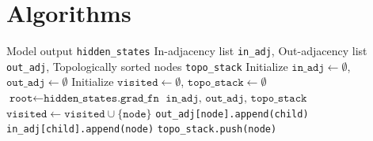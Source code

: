 \documentclass{article}
\begin{document}
\section{Algorithms}
\begin{algorithm}[H]
  \caption{Computation Graph Pre-Processing}
  \label{alg:graph-construction}
  \begin{algorithmic}[1]
    \Require Model output \texttt{hidden\_states}
    \Ensure In-adjacency list \texttt{in\_adj}, Out-adjacency list \texttt{out\_adj}, Topologically sorted nodes \texttt{topo\_stack}
    \State Initialize $\texttt{in\_adj} \gets \emptyset$, $\texttt{out\_adj} \gets \emptyset$
    \State Initialize $\texttt{visited} \gets \emptyset$, $\texttt{topo\_stack} \gets \emptyset$
    \State $\texttt{root} \gets \texttt{hidden\_states.grad\_fn}$
    \State {} 
    \Return $\texttt{in\_adj, out\_adj, topo\_stack}$ 
       
        \State \Return
      \EndIf
      \State $\texttt{visited} \gets \texttt{visited} \cup \{\texttt{node}\}$ 
        \State \texttt{out\_adj[node].append(child)} 
        \State \texttt{in\_adj[child].append(node)}
        \State {} 
      \EndFor
      \State \texttt{topo\_stack.push(node)} 
    \EndFunction
  \end{algorithmic}
\end{algorithm}
\end{document}

